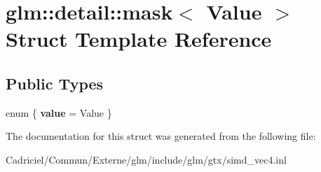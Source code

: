 \hypertarget{structglm_1_1detail_1_1mask}{}\section{glm\+:\+:detail\+:\+:mask$<$ Value $>$ Struct Template Reference}
\label{structglm_1_1detail_1_1mask}
\subsection*{Public Types}
\begin{DoxyCompactItemize}
\item 
enum \{ {\bfseries value} = Value
 \}\hypertarget{structglm_1_1detail_1_1mask_a5e277eeead970529af6af3afaa8dcac0}{}\label{structglm_1_1detail_1_1mask_a5e277eeead970529af6af3afaa8dcac0}

\end{DoxyCompactItemize}


The documentation for this struct was generated from the following file\+:\begin{DoxyCompactItemize}
\item 
Cadriciel/\+Commun/\+Externe/glm/include/glm/gtx/simd\+\_\+vec4.\+inl\end{DoxyCompactItemize}

